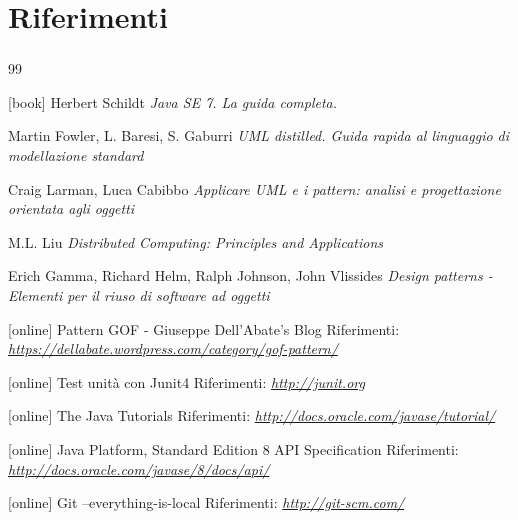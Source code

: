 \documentclass[t]{beamer} %
\begin{document}
\section {Riferimenti}
\begin {frame} [allowframebreaks] 
 \frametitle {\refname}
  \begin {thebibliography}{99}
   {\tiny 
     [book]
      Herbert Schildt
     \newblock \emph{Java SE 7. La guida completa.} 

       Martin Fowler, L. Baresi, S. Gaburri 
     \newblock \emph{UML distilled. Guida rapida al linguaggio di modellazione standard} 

      Craig Larman, Luca Cabibbo
     \newblock \emph{Applicare UML e i pattern: analisi e progettazione orientata agli oggetti} 

      M.L. Liu
     \newblock \emph{Distributed Computing: Principles and Applications} 

      Erich Gamma, Richard Helm, Ralph Johnson, John Vlissides
     \newblock \emph{Design patterns - Elementi per il riuso di software ad oggetti} 
      
     [online]
      Pattern GOF - Giuseppe Dell'Abate's Blog
     \newblock Riferimenti: \emph{\url{https://dellabate.wordpress.com/category/gof-pattern/ }}

     [online]
      Test unità con Junit4
     \newblock Riferimenti: \emph{\url{http://junit.org }}

     [online]
      The Java Tutorials 
     \newblock Riferimenti: \emph{\url{http://docs.oracle.com/javase/tutorial/ }}

     [online]
      Java Platform, Standard Edition 8 API Specification 
     \newblock Riferimenti: \emph{\url{http://docs.oracle.com/javase/8/docs/api/ }}

     [online]
      Git --everything-is-local  
     \newblock Riferimenti: \emph{\url{http://git-scm.com/ }}

}
\end{thebibliography}
\end{frame}
\end{document}
